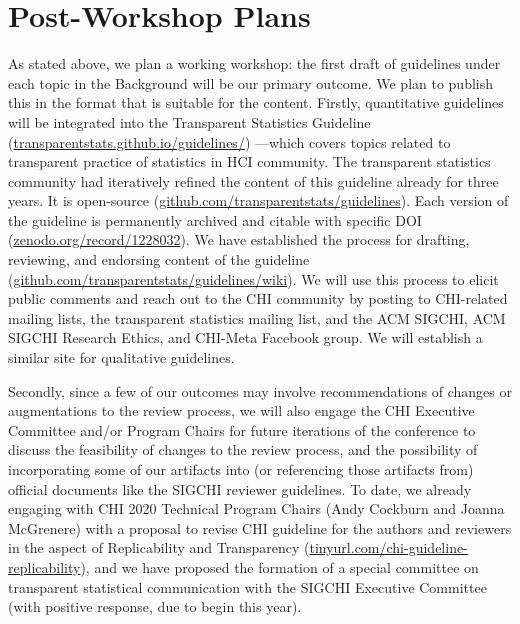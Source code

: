 \documentclass[sigchi-a, authorversion]{acmart}
\begin{document}
\section{Post-Workshop Plans}

As stated above, we plan a working workshop: the first draft of guidelines under each topic in the Background will be our primary outcome. We plan to publish this in the format that is suitable for the content. Firstly, quantitative guidelines will be integrated into the Transparent Statistics Guideline (\url{transparentstats.github.io/guidelines/}) \cite{TransparentStats2018}---which covers topics related to transparent practice of statistics in HCI community. The transparent statistics community had iteratively refined the content of this guideline already for three years. It is open-source (\url{github.com/transparentstats/guidelines}). Each version of the guideline is permanently archived and citable with specific DOI (\url{zenodo.org/record/1228032}). We have established the process for drafting, reviewing, and endorsing content of the guideline (\url{github.com/transparentstats/guidelines/wiki}). We will use this process to elicit public comments and reach out to the CHI community by posting to CHI-related mailing lists, the transparent statistics mailing list, and the ACM SIGCHI, ACM SIGCHI Research Ethics, and CHI-Meta Facebook group. We will establish a similar site for qualitative guidelines.

Secondly, since a few of our outcomes may involve recommendations of changes or augmentations to the review process, we will also engage the CHI Executive Committee and/or Program Chairs for future iterations of the conference to discuss the feasibility of changes to the review process, and the possibility of incorporating some of our artifacts into (or referencing those artifacts from) official documents like the SIGCHI reviewer guidelines. To date, we already engaging with CHI 2020 Technical Program Chairs (Andy Cockburn and Joanna McGrenere) with a proposal to revise CHI guideline for the authors and reviewers in the aspect of Replicability and Transparency (\url{tinyurl.com/chi-guideline-replicability}), and we have proposed the formation of a special committee on transparent statistical communication with the SIGCHI Executive Committee (with positive response, due to begin this year).
\end{document}
